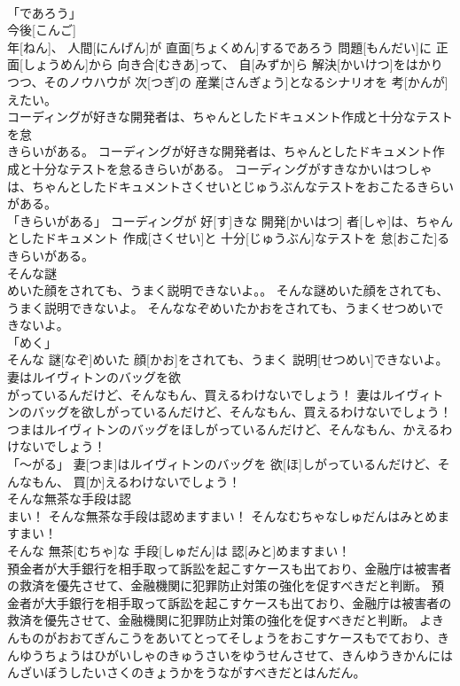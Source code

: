 \documentclass[8pt]{extreport}
\begin{document}
\begin{CJK}{UTF8}{min}
\\	「であろう」 
\\	今後[こんご] 
\\	年[ねん]、 人間[にんげん]が 直面[ちょくめん]するであろう 問題[もんだい]に 正面[しょうめん]から 向き合[むきあ]って、 自[みずか]ら 解決[かいけつ]をはかりつつ、そのノウハウが 次[つぎ]の 産業[さんぎょう]となるシナリオを 考[かんが]えたい。		
\\	コーディングが好きな開発者は、ちゃんとしたドキュメント作成と十分なテストを怠
\\	きらいがある。	コーディングが好きな開発者は、ちゃんとしたドキュメント作成と十分なテストを怠るきらいがある。	コーディングがすきなかいはつしゃは、ちゃんとしたドキュメントさくせいとじゅうぶんなテストをおこたるきらいがある。	
\\	「きらいがある」	コーディングが 好[す]きな 開発[かいはつ] 者[しゃ]は、ちゃんとしたドキュメント 作成[さくせい]と 十分[じゅうぶん]なテストを 怠[おこた]るきらいがある。		
\\	そんな謎
\\	めいた顔をされても、うまく説明できないよ。。	そんな謎めいた顔をされても、うまく説明できないよ。	そんななぞめいたかおをされても、うまくせつめいできないよ。	
\\	「めく」 
\\	そんな 謎[なぞ]めいた 顔[かお]をされても、うまく 説明[せつめい]できないよ。		
\\	妻はルイヴィトンのバッグを欲
\\	がっているんだけど、そんなもん、買えるわけないでしょう！	妻はルイヴィトンのバッグを欲しがっているんだけど、そんなもん、買えるわけないでしょう！	つまはルイヴィトンのバッグをほしがっているんだけど、そんなもん、かえるわけないでしょう！	
\\	「～がる」	妻[つま]はルイヴィトンのバッグを 欲[ほ]しがっているんだけど、そんなもん、 買[か]えるわけないでしょう！		
\\	そんな無茶な手段は認
\\	まい！	そんな無茶な手段は認めますまい！	そんなむちゃなしゅだんはみとめますまい！	
\\	そんな 無茶[むちゃ]な 手段[しゅだん]は 認[みと]めますまい！		
\\	預金者が大手銀行を相手取って訴訟を起こすケースも出ており、金融庁は被害者の救済を優先させて、金融機関に犯罪防止対策の強化を促すべきだと判断。	預金者が大手銀行を相手取って訴訟を起こすケースも出ており、金融庁は被害者の救済を優先させて、金融機関に犯罪防止対策の強化を促すべきだと判断。	よきんものがおおてぎんこうをあいてとってそしょうをおこすケースもでており、きんゆうちょうはひがいしゃのきゅうさいをゆうせんさせて、きんゆうきかんにはんざいぼうしたいさくのきょうかをうながすべきだとはんだん。	

\end{CJK}
\end{document}

